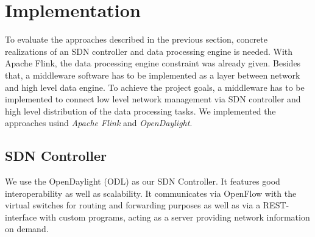 \section{Implementation}
To evaluate the approaches described in the previous section, concrete realizations of an SDN
controller and data processing engine is needed. With Apache Flink, the data processing engine
constraint was already given. Besides that, a middleware software has to be implemented as a layer
between network and high level data engine. To achieve the project goals, a middleware has to be
implemented to connect low level network management via SDN controller and high level distribution
of the data processing tasks. We implemented the approaches usind \textit{Apache Flink} and
\textit{OpenDaylight}.

\subsection{SDN Controller}
We use the OpenDaylight (ODL) as our SDN Controller. It features good interoperability as well as
scalability. It communicates via OpenFlow with the virtual switches for routing and forwarding
purposes as well as via a REST-interface with custom programs, acting as a server providing network 
information on demand. 

